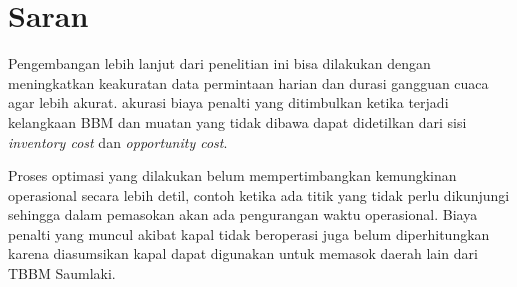 \section{Saran}
\label{chap:saran}

Pengembangan lebih lanjut dari penelitian ini bisa dilakukan dengan meningkatkan keakuratan data permintaan harian dan durasi gangguan cuaca agar lebih akurat. akurasi biaya penalti yang ditimbulkan ketika terjadi kelangkaan BBM dan muatan yang tidak dibawa dapat didetilkan dari sisi \emph{inventory cost} dan \emph{opportunity cost}.

Proses optimasi yang dilakukan belum mempertimbangkan kemungkinan operasional secara lebih detil, contoh ketika ada titik yang tidak perlu dikunjungi sehingga dalam pemasokan akan ada pengurangan waktu operasional. Biaya penalti yang muncul akibat kapal tidak beroperasi juga belum diperhitungkan karena diasumsikan kapal dapat digunakan untuk memasok daerah lain dari TBBM Saumlaki.

